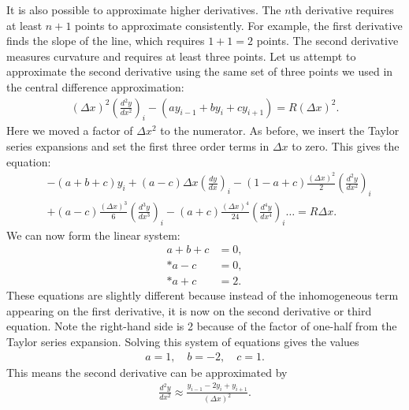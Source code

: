 It is also possible to approximate higher derivatives. The $n$th derivative requires at least $n+1$ points to approximate consistently. For example, the first derivative finds the slope of the line, which requires $1 + 1 = 2$ points. The second derivative measures curvature and requires at least three points. Let us attempt to approximate the second derivative using the same set of three points we used in the central difference approximation:
\begin{align}
  ( \Delta x )^2 \left( \frac{d^2 y}{dx^2} \right)_i - \left( a y_{i-1} + b y_i + c y_{i+1} \right) = R ( \Delta x )^2 .
\end{align}
Here we moved a factor of $\Delta x^2$ to the numerator. As before, we insert the Taylor series expansions and set the first three order terms in $\Delta x$ to zero. This gives the equation:
\begin{align}
  &-( a + b + c ) y_i + ( a - c ) \Delta x  \left( \frac{dy}{dx} \right)_i - ( 1 - a + c ) \frac{(\Delta x)^2}{2} \left( \frac{d^2 y}{dx^2} \right)_i \nonumber \\ 
  & + ( a - c ) \frac{(\Delta x)^3}{6} \left( \frac{d^3 y}{dx^3} \right)_i  - ( a + c ) \frac{(\Delta x)^4}{24} \left( \frac{d^4 y}{dx^4} \right)_i  \ldots = R \Delta x.
\end{align}
We can now form the linear system:
\begin{subequations}
\begin{align}
  a + b + c &= 0, \\*
  a - c &= 0, \\*
  a + c &= 2.
\end{align}
\end{subequations}
These equations are slightly different because instead of the inhomogeneous term appearing on the first derivative, it is now on the second derivative or third equation. Note the right-hand side is 2 because of the factor of one-half from the Taylor series expansion. Solving this system of equations gives the values
\begin{align}
  a = 1, \quad b = -2, \quad c = 1 . \nonumber
\end{align}
This means the second derivative can be approximated by
\begin{align}
  \frac{d^2 y}{dx^2} \approx \frac{ y_{i-1} - 2 y_i + y_{i+1} }{ (\Delta x)^2 } .
\end{align}

